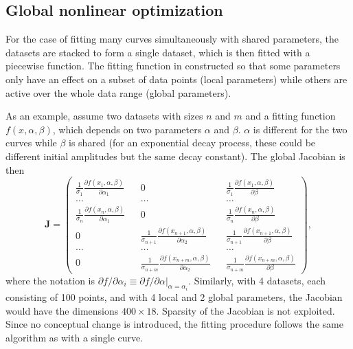 \documentclass{article}
\begin{document}
\subsection{Global nonlinear optimization}

For the case of fitting many curves simultaneously with shared parameters, the datasets are stacked to form a single dataset, which is then fitted with a piecewise function. The fitting function in constructed so that some parameters only have an effect on a subset of data points (local parameters) while others are active over the whole data range (global parameters).

As an example, assume two datasets with sizes $n$ and $m$ and a fitting function $f(x,\alpha,\beta)$, which depends on two parameters $\alpha$ and $\beta$. $\alpha$ is different for the two curves while $\beta$ is shared (for an exponential decay process, these could be different initial amplitudes but the same decay constant). The global Jacobian is then
\begin{equation}
  \label{eq:globalJacob}
  \bm J =
  \left( \begin{matrix}
      \frac{1}{\sigma_1} \frac{\partial f(x_1, \alpha, \beta)}
      {\partial\alpha_1} && 0 && \frac{1}{\sigma_1} \frac{\partial
        f(x_1, \alpha, \beta)} {\partial\beta} \\
      \ldots && \ldots && \ldots \\
      \frac{1}{\sigma_n} \frac{\partial f(x_n, \alpha, \beta)}
      {\partial\alpha_1} && 0 && \frac{1}{\sigma_n} \frac{\partial
        f(x_n, \alpha, \beta)} {\partial\beta} \\
      0 && \frac{1}{\sigma_{n+1}} \frac{\partial f(x_{n+1}, \alpha,
        \beta)} {\partial\alpha_2} && \frac{1}{\sigma_{n+1}}
      \frac{\partial f(x_{n+1}, \alpha, \beta)} {\partial\beta} \\
      \ldots && \ldots && \ldots \\
      0 && \frac{1}{\sigma_{n+m}} \frac{\partial f(x_{n+m}, \alpha,
        \beta)} {\partial\alpha_2} && \frac{1}{\sigma_{n+m}}
      \frac{\partial f(x_{n+m}, \alpha, \beta)} {\partial\beta}
    \end{matrix} \right),
\end{equation}
where the notation is $\partial f / \partial\alpha_i \equiv \partial f / \partial\alpha |_{\alpha = \alpha_i}$. Similarly, with 4 datasets, each consisting of 100 points, and with 4 local and 2 global parameters, the Jacobian would have the dimensions $400\times18$. Sparsity of the Jacobian is not exploited. Since no conceptual change is introduced, the fitting procedure follows the same algorithm as with a single curve.
\end{document}
